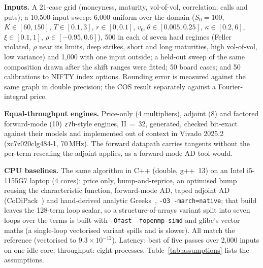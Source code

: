 \documentclass[conference]{IEEEtran}
\begin{document}
\textbf{Inputs.} A 21-case grid (moneyness, maturity, vol-of-vol, correlation; calls and puts); a
10,500-input sweep: 6,000 uniform over the domain ($S_0{=}100$, $K\in[60,150]$, $T\in[0.1,3]$,
$r\in[0,0.1]$, $v_0,\theta\in[0.005,0.25]$, $\kappa\in[0.2,6]$, $\xi\in[0.1,1]$, $\rho\in[-0.95,0.6]$),
500 in each of seven hard regimes (Feller violated, $\rho$ near its limits, deep strikes, short and long
maturities, high vol-of-vol, low variance) and 1,000 with one input outside; a held-out sweep of the
same composition drawn after the shift ranges were fitted; 50 board cases; and 50 calibrations to
NIFTY index options. Rounding error is measured against the same graph in double precision; the COS
result separately against a Fourier-integral price.

\textbf{Equal-throughput engines.} Price-only (4 multipliers), adjoint (8) and factored forward-mode
(10) \texttt{z7h}-style engines, II\,$=$\,32, generated, checked bit-exact against their models and
implemented out of context in Vivado 2025.2 (xc7z020clg484-1, 70\,MHz). The forward datapath carries
tangents without the per-term rescaling the adjoint applies, as a forward-mode AD tool would.

\textbf{CPU baselines.} The same algorithm in C++ (double, g++~13) on an Intel i5-1155G7 laptop
(4 cores): price only, bump-and-reprice, an optimised bump reusing the characteristic function,
forward-mode AD, taped adjoint AD (CoDiPack~\cite{codipack}) and hand-derived analytic
Greeks~\cite{cui}, \texttt{-O3 -march=native}; that build leaves the 128-term loop scalar, so a
structure-of-arrays variant split into seven loops over the terms is built with \texttt{-Ofast
-fopenmp-simd} and glibc's vector maths (a single-loop vectorised variant spills and is slower).
All match the reference (vectorised to $9.3\times10^{-12}$). Latency: best of five passes over 2,000
inputs on one idle core; throughput: eight processes. Table~\ref{tab:assumptions} lists the
assumptions.
\end{document}
